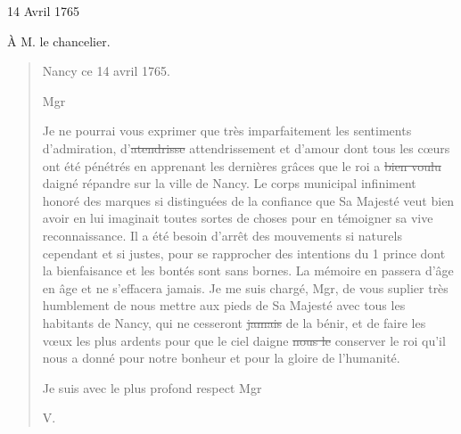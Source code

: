                      \begin{diary}{14 Avril 1765}{}
                        
                         À M. le
                              chancelier. \bigskip
        
        
                        \begin{quote}\begin{flushright}
                                 Nancy ce 14 avril 1765. \end{flushright}\bigskip
                    
                    
                                 Mgr \bigskip
                    
                    
                              Je ne pourrai vous exprimer que très imparfaitement
                              les sentiments d'admiration, d'\sout{atendrisse} attendrissement et
                              d'amour dont tous les cœurs ont été pénétrés
                              en apprenant les dernières grâces que le roi
                              a \sout{bien voulu}
                              daigné répandre sur la ville de Nancy.
                              Le corps municipal infiniment honoré des
                              marques si distinguées de la confiance
                              que
                              Sa Majesté veut bien avoir en lui imaginait
                              toutes sortes de choses pour en témoigner sa
                              vive reconnaissance. Il a été besoin d'arrêt
                              des mouvements si naturels cependant et si justes, pour
                              se rapprocher des intentions du 1 prince dont
                              la bienfaisance et les bontés sont sans bornes.
                              La mémoire en passera d'âge en âge et
                              ne
                              s'effacera jamais. Je me suis chargé, Mgr,
                              de vous suplier très humblement de nous mettre aux pieds de Sa Majesté avec tous les
                              habitants de Nancy, qui ne
                              cesseront
                              \sout{jamais} de la bénir, et de faire
                              les vœux
                              les plus ardents pour que le ciel daigne
                              \sout{nous le} conserver le roi qu'il nous a
                              donné pour notre bonheur et pour la
                              gloire
                              de l'humanité. \bigskip
        
         Je suis avec le plus profond respect
                                 Mgr \begin{flushright}
                                 V.
                              \end{flushright}\end{quote}
                     \end{diary}

